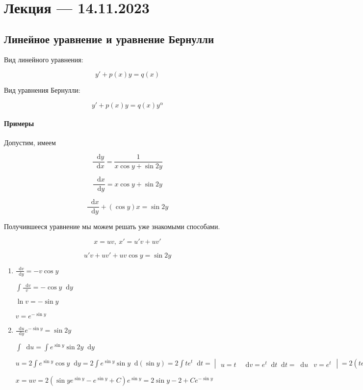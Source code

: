 \documentclass{article}
\newcommand*\diff{\mathop{}\!\mathrm{d}}
\begin{document}
\pagebreak
\section{Лекция — 14.11.2023}

\subsection{Линейное уравнение и уравнение Бернулли}

Вид линейного уравнения:

$$y' + p(x) y = q(x)$$

Вид уравнения Бернулли:

$$y' + p(x) y = q(x) y^{\alpha}$$

\paragraph{Примеры}

Допустим, имеем

$$\frac{\diff y}{\diff x} = \frac{1}{x \cos y + \sin 2 y}$$

$$\frac{\diff x}{\diff y} = x \cos y + \sin 2 y$$

$$\frac{\diff x}{\diff y} + (\cos y) x = \sin 2y$$

Получившееся уравнение мы можем решать уже знакомыми способами.

$$x = u v, \ x' = u' v + u v'$$

$$u'v + uv' + u v \cos y = \sin 2y$$

\begin{enumerate}
    \item 

    $\frac{\diff v}{\diff y} = -v \cos y$

    $\int \frac{\diff v}{v} = -\cos y \diff y$

    $\ln v = - \sin y$

    $v = e^{-\sin y}$

    \item
    
    $\frac{\diff u}{\diff y} e^{- \sin y} = \sin 2y$

    $\int \diff u = \int e^{\sin y} \sin 2y \diff y$

    $u = 2 \int e^{\sin y} \cos y \diff y = 2 \int e^{\sin y} \sin y \diff (\sin y) = 2 \int t e^{t} \diff t = \begin{vmatrix}
        u = t & \diff v = e^{t} \diff t
        \diff t = \diff u & v = e^{t}
    \end{vmatrix} = 2 (te^{t} - e^{t}) + C$

    $x = uv = 2 (\sin y e^{\sin y} - e^{\sin y} + C) e^{\sin y} = 2 \sin y - 2 + C e^{- \sin y}$
\end{enumerate}
\end{document}
